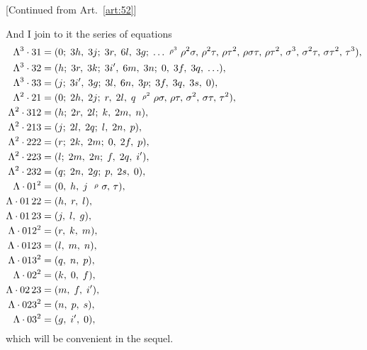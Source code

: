 \documentclass[11pt,a4paper]{book}
\begin{document}
\newpage
\begin{art}\label{art:52cont}
[Continued from Art.~\ref{art:52}]

And I join to it the series of equations
\begin{align*}
\Lambda^3 \cdot 31 &= (0;\; 3h,\; 3j;\; 3r,\; 6l,\; 3g;\; \ldots \,\, \raisebox{0.5ex}{\text{\scriptsize$\rho^3$}}\,\, \rho^2\sigma,\, \rho^2\tau,\, \rho\tau^2,\, \rho\sigma\tau,\, \rho\tau^2,\, \sigma^3,\, \sigma^2\tau,\, \sigma\tau^2,\, \tau^3),\\
\Lambda^3 \cdot 32 &= (h;\; 3r,\; 3k;\; 3i',\; 6m,\; 3n;\; 0,\; 3f,\; 3q,\; \ldots),\\
\Lambda^3 \cdot 33 &= (j;\; 3i',\; 3g;\; 3l,\; 6n,\; 3p;\; 3f,\; 3q,\; 3s,\; 0),\\
\Lambda^2 \cdot 21 &= (0;\; 2h,\; 2j;\; r,\; 2l,\; q \,\,\,\, \raisebox{0.5ex}{\text{\scriptsize$\rho^2$}}\,\, \rho\sigma,\, \rho\tau,\, \sigma^2,\, \sigma\tau,\, \tau^2),\\
\Lambda^2 \cdot 312 &= (h;\; 2r,\; 2l;\; k,\; 2m,\; n),\\
\Lambda^2 \cdot 213 &= (j;\; 2l,\; 2q;\; l,\; 2n,\; p),\\
\Lambda^2 \cdot 222 &= (r;\; 2k,\; 2m;\; 0,\; 2f,\; p),\\
\Lambda^2 \cdot 223 &= (l;\; 2m,\; 2n;\; f,\; 2q,\; i'),\\
\Lambda^2 \cdot 232 &= (q;\; 2n,\; 2g;\; p,\; 2s,\; 0),\\
\Lambda \cdot 01^2 &= (0,\; h,\; j \,\,\,\, \raisebox{0.5ex}{\text{\scriptsize$\rho$}}\,\, \sigma,\, \tau),\\
\Lambda \cdot 01\,22 &= (h,\; r,\; l),\\
\Lambda \cdot 01\,23 &= (j,\; l,\; g),\\
\Lambda \cdot 012^2 &= (r,\; k,\; m),\\
\Lambda \cdot 0123 &= (l,\; m,\; n),\\
\Lambda \cdot 013^2 &= (q,\; n,\; p),\\
\Lambda \cdot 02^2 &= (k,\; 0,\; f),\\
\Lambda \cdot 02\,23 &= (m,\; f,\; i'),\\
\Lambda \cdot 023^2 &= (n,\; p,\; s),\\
\Lambda \cdot 03^2 &= (g,\; i',\; 0),
\end{align*}
which will be convenient in the sequel.
\end{art}
\end{document}
